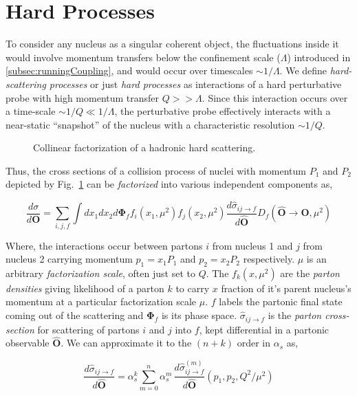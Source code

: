 \section{Hard Processes}
To consider any nucleus as a singular coherent object, the fluctuations inside it would involve momentum transfers below the confinement scale (\(\Lambda\)) introduced in \ref{subsec:runningCoupling}, and would occur over timescales \(\sim 1/\Lambda\). We define \emph{hard-scattering processes} or just \emph{hard processes} as interactions of a hard perturbative probe with high momentum transfer \(Q >> \Lambda\). Since this interaction occurs over a time-scale \(\sim 1/Q \ll 1/\Lambda\), the perturbative probe effectively interacts with a near-static ``snapshot'' of the nucleus with a characteristic resolution \(\sim 1/Q\). 

\begin{figure}[htbp]
	\centering
	\factorizationdiagram
	\caption{Collinear factorization of a hadronic hard scattering.}
	\label{fig:factorization}
\end{figure}

Thus, the cross sections of a collision process of nuclei with momentum \(P_1\) and \(P_2\) depicted by Fig.~\ref{fig:factorization} can be \emph{factorized} into various independent components as,

\begin{equation}
	\frac{d\sigma}{d\mathbf{O}}  = \sum_{i,j,f} \int dx_1dx_2d\mathbf{\Phi}_ff_i(x_1, \mu^2)f_j(x_2, \mu^2)\frac{d\hat{\sigma}_{ij\to f}}{d\hat{\mathbf{O}}}D_f(\hat{\mathbf{O}}\to\mathbf{O}, \mu^2)
	\label{eq:factorization}
\end{equation}

Where, the interactions occur between partons \(i\) from nucleus 1 and \(j\) from nucleus 2 carrying momentum \(p_1 = x_1P_1\) and \(p_2 = x_2P_2\) respectively. \(\mu\) is an arbitrary \emph{factorization scale}, often just set to \(Q\). The \(f_{k}(x, \mu^2)\) are the \emph{parton densities} giving likelihood of a parton \(k\) to carry \(x\) fraction of it's parent nucleus's momentum at a particular factorization scale \(\mu\). \(f\) labels the partonic final state coming out of the scattering and \(\mathbf{\Phi}_f\) is its phase space. \(\hat{\sigma}_{ij\to f}\)  is the \emph{parton cross-section} for scattering of partons \(i\) and \(j\) into \(f\), kept differential in a partonic observable \(\hat{\mathbf{O}}\). We can approximate it to the \((n+k)\) order in \(\alpha_s\) as, 

\begin{equation}
	\frac{d\hat{\sigma}_{ij\to f}}{d\hat{\mathbf{O}}} = \alpha_s^k \sum_{m=0}^{n}\alpha_s^m\,\frac{d\hat{\sigma}^{(m)}_{ij\to f}}{d\hat{\mathbf{O}}}(p_1, p_2, Q^2/\mu^2)
	\label{eq:partonXsecOrders}
\end{equation}

